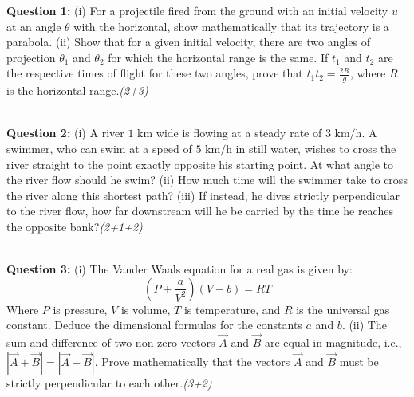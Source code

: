 \documentclass[12pt, a4paper]{article}
\newcommand{\question}[4]{
\vspace{1.5mm}
\begin{raggedright}
\textbf{Question #1:} #2\hfill\textit{#3}\\
\textit{#4}\\
\end{raggedright}}
\begin{document}
\question{1}{(i) For a projectile fired from the ground with an initial velocity $u$ at an angle $\theta$ with the horizontal, show mathematically that its trajectory is a parabola.
\newline (ii) Show that for a given initial velocity, there are two angles of projection $\theta_1$ and $\theta_2$ for which the horizontal range is the same. If $t_1$ and $t_2$ are the respective times of flight for these two angles, prove that $t_1 t_2 = \frac{2R}{g}$, where $R$ is the horizontal range.}
{(2+3)}{}

\question{2}{(i) A river $1 \text{ km}$ wide is flowing at a steady rate of $3 \text{ km/h}$. A swimmer, who can swim at a speed of $5 \text{ km/h}$ in still water, wishes to cross the river straight to the point exactly opposite his starting point. At what angle to the river flow should he swim?
\newline (ii) How much time will the swimmer take to cross the river along this shortest path?
\newline (iii) If instead, he dives strictly perpendicular to the river flow, how far downstream will he be carried by the time he reaches the opposite bank?}
{(2+1+2)}{}

\question{3}{(i) The Vander Waals equation for a real gas is given by:
$$ \left(P + \frac{a}{V^2}\right)(V - b) = RT $$
Where $P$ is pressure, $V$ is volume, $T$ is temperature, and $R$ is the universal gas constant. Deduce the dimensional formulas for the constants $a$ and $b$.
\newline (ii) The sum and difference of two non-zero vectors $\vec{A}$ and $\vec{B}$ are equal in magnitude, i.e., $|\vec{A} + \vec{B}| = |\vec{A} - \vec{B}|$. Prove mathematically that the vectors $\vec{A}$ and $\vec{B}$ must be strictly perpendicular to each other.}
{(3+2)}{}
\end{document}
